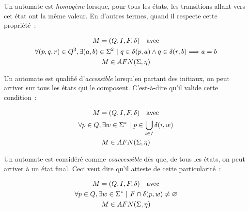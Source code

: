 \begin{definition}
    Un automate est \textit{homogène} lorsque, pour tous les états, les
    transitions allant vers cet état ont la même valeur. En d'autres termes,
    quand il respecte cette propriété~:

    \begin{gather*}
        M = (Q, I, F, \delta) \quad \text{avec} \\
        \forall (p, q, r) \in Q^3, \exists (a, b) \in \Sigma^2 ~|~ q \in \delta(p, a) \land q \in \delta(r, b) \Longrightarrow a = b \notag \\
        M \in AFN(\Sigma, \eta) \notag
    \end{gather*}
\end{definition}

\begin{definition}
    Un automate est qualifié d'\textit{accessible} lorsqu'en partant des
    initiaux, on peut arriver sur tous les états qui le composent. C'est-à-dire
    qu'il valide cette condition~:

    \begin{gather*}
        M = (Q, I, F, \delta) \quad \text{avec} \\
        \forall p \in Q, \exists w \in \Sigma^* ~|~ p \in \bigcup_{i \in I} \delta(i, w) \notag \\
        M \in AFN(\Sigma, \eta) \notag
    \end{gather*}
\end{definition}

\begin{definition}
    Un automate est considéré comme \textit{coaccessible} dès que, de tous les
    états, on peut arriver à un état final. Ceci veut dire qu'il atteste de
    cette particularité~:

    \begin{gather*}
        M = (Q, I, F, \delta) \quad \text{avec} \\
        \forall p \in Q, \exists w \in \Sigma^* ~|~ F \cap \delta(p, w) \neq \varnothing \notag \\
        M \in AFN(\Sigma, \eta) \notag
    \end{gather*}
\end{definition}


